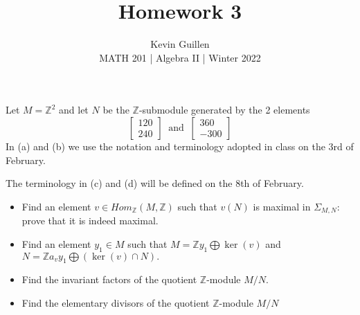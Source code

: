 \documentclass[11pt]{article}
\newenvironment{problem}[2][Problem\!]{\begin{trivlist}
\item[\hskip \labelsep {\bfseries #1}\hskip \labelsep {\bfseries #2}]}{\end{trivlist}}
\newcommand{\zz}{\mathbb Z}   %
\begin{document}
 
\title{Homework 3}
\author{Kevin Guillen\\[0.5em]
MATH 201 | Algebra II | Winter 2022}
\date{} 
\maketitle


\begin{tcolorbox}
  \begin{problem} {1}
    Let $M = \zz^2$ and let $N$ be the $\zz$-submodule generated by the 2 elements 
    \[\begin{bmatrix}
        120 \\ 240
    \end{bmatrix} \ \text{ and } \ \begin{bmatrix}
        360 \\ -300
    \end{bmatrix}\]
    In (a) and (b) we use the notation and terminology adopted in class on the 3rd of February.

    The terminology in (c) and (d) will be defined on the 8th of February.
    \begin{itemize}
      \item[(a)]
        Find an element $v \in Hom_\zz(M,\zz)$ such that $v(N)$ is maximal in $\Sigma_{M,N}$: prove that it is indeed maximal. 
      \item[(b)]
        Find an element $y_1 \in M$ such that $M = \zz{y_1} \bigoplus \ker(v)$ and $N = \zz a_v y_1 \bigoplus (\ker(v) \cap N).$ 
      \item[(c)]
        Find the invariant factors of the quotient $\zz$-module $M/N$. 
      \item[(d)]   
        Find the elementary divisors of the quotient $\zz$-module $M/N$ 
    \end{itemize}
  \end{problem}
\end{tcolorbox}
\end{document}
